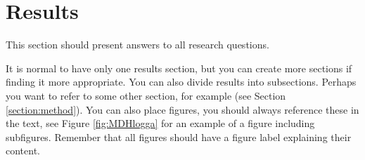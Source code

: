 \section{Results}
\label{section:results}
This section should present answers to all research questions.

It is normal to have only one results section, but you can create more sections if finding it more appropriate. You can also divide results into subsections. Perhaps you want to refer to some other section, for example (see Section \ref{section:method}). You can also place figures, you should always reference these in the text, see Figure \ref{fig:MDHlogga} for an example of a figure including subfigures. Remember that all figures should have a figure label explaining their content.



